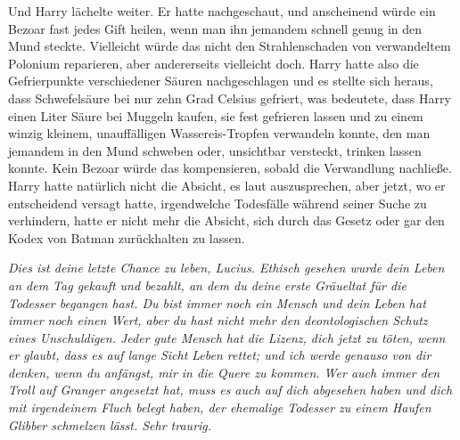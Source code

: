 Und Harry lächelte weiter. Er hatte nachgeschaut, und anscheinend würde ein Bezoar fast jedes Gift heilen, wenn man ihn jemandem schnell genug in den Mund steckte. Vielleicht würde das nicht den Strahlenschaden von verwandeltem Polonium reparieren, aber andererseits vielleicht doch. Harry hatte also die Gefrierpunkte verschiedener Säuren nachgeschlagen und es stellte sich heraus, dass Schwefelsäure bei nur zehn Grad Celsius gefriert, was bedeutete, dass Harry einen Liter Säure bei Muggeln kaufen, sie fest gefrieren lassen und zu einem winzig kleinem, unauffälligen Wassereis-Tropfen verwandeln konnte, den man jemandem in den Mund schweben oder, unsichtbar versteckt, trinken lassen konnte. Kein Bezoar würde das kompensieren, sobald die Verwandlung nachließe. Harry hatte natürlich nicht die Absicht, es laut auszusprechen, aber jetzt, wo er entscheidend versagt hatte, irgendwelche Todesfälle während seiner Suche zu verhindern, hatte er nicht mehr die Absicht, sich durch das Gesetz oder gar den Kodex von Batman zurückhalten zu lassen.

\emph{Dies ist deine letzte Chance zu leben, Lucius. Ethisch gesehen wurde dein Leben an dem Tag gekauft und bezahlt, an dem du deine erste Gräueltat für die Todesser begangen hast. Du bist immer noch ein Mensch und dein Leben hat immer noch einen Wert, aber du hast nicht mehr den deontologischen Schutz eines Unschuldigen. Jeder gute Mensch hat die Lizenz, dich jetzt zu töten, wenn er glaubt, dass es auf lange Sicht Leben rettet; und ich werde genauso von dir denken, wenn du anfängst, mir in die Quere zu kommen. Wer auch immer den Troll auf Granger angesetzt hat, muss es auch auf dich abgesehen haben und dich mit irgendeinem Fluch belegt haben, der ehemalige Todesser zu einem Haufen Glibber schmelzen lässt. Sehr traurig.}

